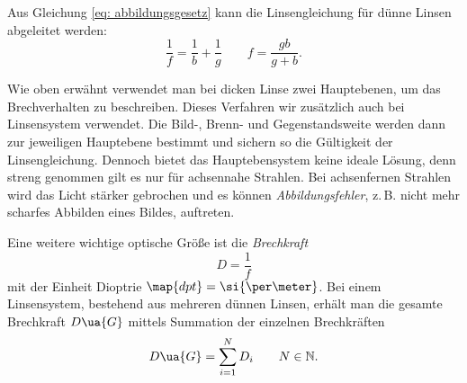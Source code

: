 Aus Gleichung \eqref{eq: abbildungsgesetz} kann die Linsengleichung für dünne Linsen abgeleitet werden:
\begin{equation}
  \label{eq: linsengleichung}
  \frac{1}{f}= \frac{1}{b}+  \frac{1}{g} \qquad f= \frac{gb}{g+b}.
\end{equation}

Wie oben erwähnt verwendet man bei dicken Linse zwei Hauptebenen, um das Brechverhalten
zu beschreiben. Dieses Verfahren wir zusätzlich auch bei Linsensystem verwendet.
Die Bild-, Brenn- und Gegenstandsweite werden dann zur jeweiligen Hauptebene
bestimmt und sichern so die Gültigkeit der Linsengleichung.
Dennoch bietet das Hauptebensystem keine ideale Lösung, denn streng genommen
gilt es nur für achsennahe Strahlen. Bei achsenfernen Strahlen wird das Licht stärker
gebrochen und es können \emph{Abbildungsfehler}, z.\,B. nicht mehr scharfes Abbilden eines Bildes,
auftreten.

Eine weitere wichtige optische Größe ist die \emph{Brechkraft}
\begin{equation}
  \label{eq: brechkraft}
  D=\frac{1}{f}
\end{equation}
mit der Einheit Dioptrie $\map{dpt}=\si{\per \meter}$.
Bei einem Linsensystem, bestehend aus mehreren dünnen Linsen, erhält man die gesamte
Brechkraft $D\ua{G}$ mittels Summation der einzelnen Brechkräften
\begin{equation*}
  D\ua{G}=\sum_{i=1}^{N}D_i \qquad N\in\mathbb{N}.
\end{equation*}
